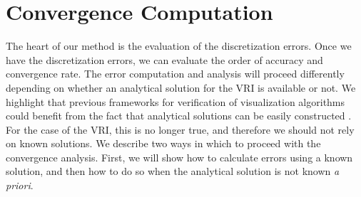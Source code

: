 
 



\section{Convergence Computation}
\label{sec:convergence_analysis}

The heart of our method is the evaluation of the discretization
errors. Once we have the discretization errors, we can evaluate the
order of accuracy and convergence rate.  The error computation and
analysis will proceed differently depending on whether an analytical
solution for the VRI is available or not. We highlight that previous
frameworks for verification of visualization algorithms could benefit
from the fact that analytical solutions can be easily constructed
\cite{etiene:tvcg:2009}. For the case of the VRI, this is no longer true, and
therefore we should not rely on known solutions.  We describe
two ways in which to proceed with the convergence analysis. First, we
will show how to calculate errors using a known solution, and then how
to do so when the analytical solution is not known {\em a priori}.

